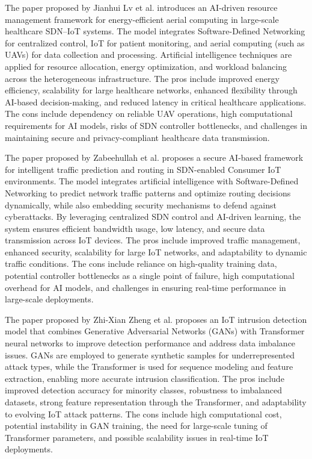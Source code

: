 \documentclass[a4paper,fleqn]{cas-dc}
\numberwithin{equation}{section}
\begin{document}
The paper proposed by Jianhui Lv et al.\cite{Lv202523536} introduces an AI-driven resource management framework for energy-efficient aerial computing in large-scale healthcare SDN–IoT systems. The model integrates Software-Defined Networking for centralized control, IoT for patient monitoring, and aerial computing (such as UAVs) for data collection and processing. Artificial intelligence techniques are applied for resource allocation, energy optimization, and workload balancing across the heterogeneous infrastructure. The pros include improved energy efficiency, scalability for large healthcare networks, enhanced flexibility through AI-based decision-making, and reduced latency in critical healthcare applications. The cons include dependency on reliable UAV operations, high computational requirements for AI models, risks of SDN controller bottlenecks, and challenges in maintaining secure and privacy-compliant healthcare data transmission.

The paper proposed by Zabeehullah et al.\cite{Zabeehullah2025} proposes a secure AI-based framework for intelligent traffic prediction and routing in SDN-enabled Consumer IoT environments. The model integrates artificial intelligence with Software-Defined Networking to predict network traffic patterns and optimize routing decisions dynamically, while also embedding security mechanisms to defend against cyberattacks. By leveraging centralized SDN control and AI-driven learning, the system ensures efficient bandwidth usage, low latency, and secure data transmission across IoT devices. The pros include improved traffic management, enhanced security, scalability for large IoT networks, and adaptability to dynamic traffic conditions. The cons include reliance on high-quality training data, potential controller bottlenecks as a single point of failure, high computational overhead for AI models, and challenges in ensuring real-time performance in large-scale deployments.

The paper proposed by Zhi-Xian Zheng et al.\cite{Zheng20251011} proposes an IoT intrusion detection model that combines Generative Adversarial Networks (GANs) with Transformer neural networks to improve detection performance and address data imbalance issues. GANs are employed to generate synthetic samples for underrepresented attack types, while the Transformer is used for sequence modeling and feature extraction, enabling more accurate intrusion classification. The pros include improved detection accuracy for minority classes, robustness to imbalanced datasets, strong feature representation through the Transformer, and adaptability to evolving IoT attack patterns. The cons include high computational cost, potential instability in GAN training, the need for large-scale tuning of Transformer parameters, and possible scalability issues in real-time IoT deployments.
\end{document}
